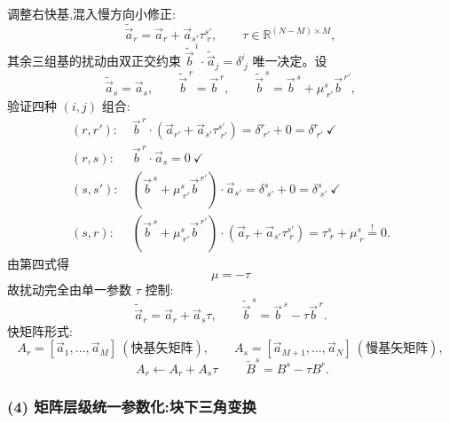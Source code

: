 \documentclass[11pt,a4paper]{article}
\newcommand{\R}{\mathbb{R}}
\begin{document}
调整右快基,混入慢方向小修正:
\begin{equation}
\tilde{\vec a}_r=\vec a_r+\vec a_{s'}\tau^{s'}_{\;r},\qquad \tau\in\R^{(N-M)\times M},
\end{equation}
其余三组基的扰动由双正交约束 $\tilde{\vec b}^{\,i}\cdot\tilde{\vec a}_j=\delta^{i}_{\;j}$ 唯一决定。设
\begin{equation}
\tilde{\vec a}_s=\vec a_s,\qquad \tilde{\vec b}^{\,r}=\vec b^{\,r},\qquad \tilde{\vec b}^{\,s}=\vec b^{\,s}+\mu^{s}_{\;r'}\vec b^{\,r'},
\end{equation}
验证四种 $(i,j)$ 组合:
\begin{align}
(r,r'):\ &\vec b^{\,r}\cdot(\vec a_{r'}+\vec a_{s'}\tau^{s'}_{\;r'})=\delta^{r}_{\;r'}+0=\delta^{r}_{\;r'}\ \checkmark\\
(r,s):\ &\vec b^{\,r}\cdot\vec a_s=0\ \checkmark\\
(s,s'):\ &(\vec b^{\,s}+\mu^{s}_{\;r'}\vec b^{\,r'})\cdot\vec a_{s'}=\delta^{s}_{\;s'}+0=\delta^{s}_{\;s'}\ \checkmark\\
(s,r):\ &(\vec b^{\,s}+\mu^{s}_{\;r'}\vec b^{\,r'})\cdot(\vec a_r+\vec a_{s'}\tau^{s'}_{\;r})=\tau^{s}_{\;r}+\mu^{s}_{\;r}\overset{!}{=}0.
\end{align}
由第四式得
\begin{equation}
\boxed{\;\mu=-\tau\;}
\end{equation}
故扰动完全由单一参数 $\tau$ 控制:
\begin{equation}
\tilde{\vec a}_r=\vec a_r+\vec a_s\tau,\qquad \tilde{\vec b}^{\,s}=\vec b^{\,s}-\tau\vec b^{\,r}.
\end{equation}
快矩阵形式:
\begin{equation}
A_r=[\vec a_1,\dots,\vec a_M]\ (\text{快基矢矩阵}),\qquad A_s=[\vec a_{M+1},\dots,\vec a_N]\ (\text{慢基矢矩阵}),
\end{equation}
\begin{equation}
\boxed{\;A_r\leftarrow A_r+A_s\tau\;}\qquad \widetilde B^{s}=B^{s}-\tau B^{r}.
\end{equation}

\subsubsection*{(4) 矩阵层级统一参数化:块下三角变换}
\end{document}
